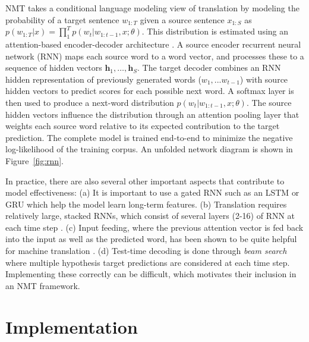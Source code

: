 \documentclass[11pt]{article}
\begin{document}
NMT takes a conditional language modeling view of translation by modeling the
probability of a target sentence $w_{1:T}$ given a source sentence
$x_{1:S}$ as
$p(w_{1:T}| x) = \prod_{1}^T p(w_t| w_{1:t-1}, x; \theta)$. This
distribution is estimated using an attention-based encoder-decoder
architecture \cite{Bahdanau2015}. A source encoder recurrent neural
network (RNN) maps each source word to a word vector, and processes
these to a sequence of hidden vectors
$\mathbf{h}_1, \ldots, \mathbf{h}_S$.  The target decoder combines an
RNN hidden representation of previously generated words
($w_1, ... w_{t-1}$) with source hidden vectors to predict scores for
each possible next word. A softmax layer is then used to produce a
next-word distribution $ p(w_t| w_{1:t-1}, x; \theta)$. The source
hidden vectors influence the distribution through an attention pooling
layer that weights each source word relative to its expected
contribution to the target prediction. The complete model is trained
end-to-end to minimize the negative log-likelihood of the training
corpus. An unfolded network diagram is shown in Figure~\ref{fig:rnn}.


In practice, there are also several other important aspects that
contribute to model effectiveness: (a) It is important to use a gated
RNN such as an LSTM \cite{hochreiter1997long} or GRU
\cite{chung2014empirical} which help the model learn long-term
features. (b) Translation requires relatively large, stacked RNNs,
which consist of several layers (2-16) of RNN at each time step
\cite{sutskever14sequence}. (c) Input feeding, where the previous
attention vector is fed back into the input as well as the predicted
word, has been shown to be quite helpful for machine translation
\cite{Luong2015}.  (d) Test-time decoding is done through \textit{beam
  search} where multiple hypothesis target predictions are considered
at each time step. Implementing these correctly can be difficult, which motivates their inclusion in an NMT framework.






\section{Implementation}
\end{document}
